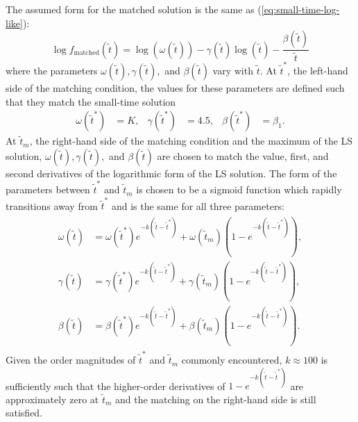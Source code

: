 The assumed form for the matched solution is the same as
(\ref{eq:small-time-log-like}):
\[
  \log f_{\mbox{matched}}(\tilde{t}) = \log(\omega(\tilde{t})) -
  \gamma(\tilde{t})\log(\tilde{t}) -
  \frac{\beta(\tilde{t})}{\tilde{t}}
\]
where the parameters $\omega(\tilde{t}), \gamma(\tilde{t}),$ and
$\beta(\tilde{t})$ vary with $\tilde{t}$. At $\tilde{t}^*$, the
left-hand side of the matching condition, the values for these
parameters are defined such that they match the small-time solution
\begin{align*}
  \omega(\tilde{t}^*) &= K, & \gamma(\tilde{t}^*) &= 4.5, & \beta(\tilde{t}^*) &= \beta_1.
\end{align*}
At $\tilde{t}_m$, the right-hand side of the matching condition and
the maximum of the LS solution,
$\omega(\tilde{t}), \gamma(\tilde{t}),$ and $\beta(\tilde{t})$ are
chosen to match the value, first, and second derivatives of the
logarithmic form of the LS solution. The form of the parameters
between $\tilde{t}^*$ and $\tilde{t}_m$ is chosen to be a sigmoid
function which rapidly transitions away from $\tilde{t}^*$ and is the
same for all three parameters:
\begin{align}
  \begin{split}
    \omega(\tilde{t}) &= \omega(\tilde{t}^*)e^{-k(\tilde{t}-\tilde{t}^*)} + \omega(\tilde{t}_m)\left(1-e^{-k(\tilde{t}-\tilde{t}^*)}\right), \\
    \gamma(\tilde{t}) &= \gamma(\tilde{t}^*)e^{-k(\tilde{t}-\tilde{t}^*)} + \gamma(\tilde{t}_m)\left(1-e^{-k(\tilde{t}-\tilde{t}^*)}\right), \\
    \beta(\tilde{t}) &= \beta(\tilde{t}^*)e^{-k(\tilde{t}-\tilde{t}^*)} + \beta(\tilde{t}_m)\left(1-e^{-k(\tilde{t}-\tilde{t}^*)}\right).
  \end{split}
\end{align}
Given the order magnitudes of $\tilde{t}^*$ and $\tilde{t}_m$ commonly
encountered, $k \approx 100$ is sufficiently such that the
higher-order derivatives of $1-e^{-k(\tilde{t}-\tilde{t}^*)}$ are
approximately zero at $\tilde{t}_m$ and the matching on the right-hand
side is still satisfied.



